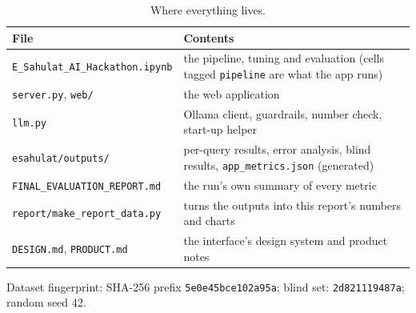 \documentclass[11pt,a4paper]{article}
\begin{document}
\begin{table}[H]
\centering\small
\begin{tabularx}{\textwidth}{@{}l X@{}}
\toprule
File & Contents\\
\midrule
\texttt{E\_Sahulat\_AI\_Hackathon.ipynb} & the pipeline, tuning and evaluation (cells tagged \texttt{pipeline} are what the app runs)\\
\texttt{server.py}, \texttt{web/} & the web application\\
\texttt{llm.py} & Ollama client, guardrails, number check, start-up helper\\
\texttt{esahulat/outputs/} & per-query results, error analysis, blind results, \texttt{app\_metrics.json} (generated)\\
\texttt{FINAL\_EVALUATION\_REPORT.md} & the run's own summary of every metric\\
\texttt{report/make\_report\_data.py} & turns the outputs into this report's numbers and charts\\
\texttt{DESIGN.md}, \texttt{PRODUCT.md} & the interface's design system and product notes\\
\bottomrule
\end{tabularx}
\caption{Where everything lives.}
\end{table}

Dataset fingerprint: SHA-256 prefix \texttt{5e0e45bce102a95a}; blind set: \texttt{2d821119487a}; random seed 42.
\end{document}
